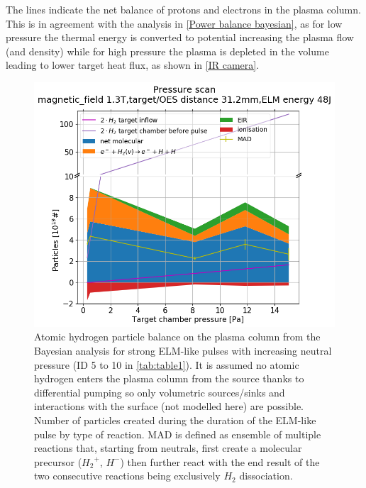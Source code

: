 The lines indicate the net balance of protons and electrons in the plasma column. This is in agreement with the analysis in \autoref{Power balance bayesian}, as for low pressure the thermal energy is converted to potential increasing the plasma flow (and density) while for high pressure the plasma is depleted in the volume leading to lower target heat flux, as shown in \autoref{IR camera}.

\begin{figure}[!ht]
        \centering
    	\includegraphics[width=0.7\linewidth,trim={35 5 60 50},clip]{Chapters/chapter3/figs/Bayesian_strong_7.png}
	\caption{Atomic hydrogen particle balance on the plasma column from the Bayesian analysis for strong ELM-like pulses with increasing neutral pressure (ID 5 to 10 in \autoref{tab:table1}). It is assumed no atomic hydrogen enters the plasma column from the source thanks to differential pumping so only volumetric sources/sinks and interactions with the surface (not modelled here) are possible. Number of particles created during the duration of the ELM-like pulse by type of reaction. MAD is defined as ensemble of multiple reactions that, starting from neutrals, first create a molecular precursor (${H_2}^+$, $H^-$) then further react with the end result of the two consecutive reactions being exclusively $H_2$ dissociation.\cite{Verhaegh2020}}
	\label{fig:bayes4}
\end{figure}

